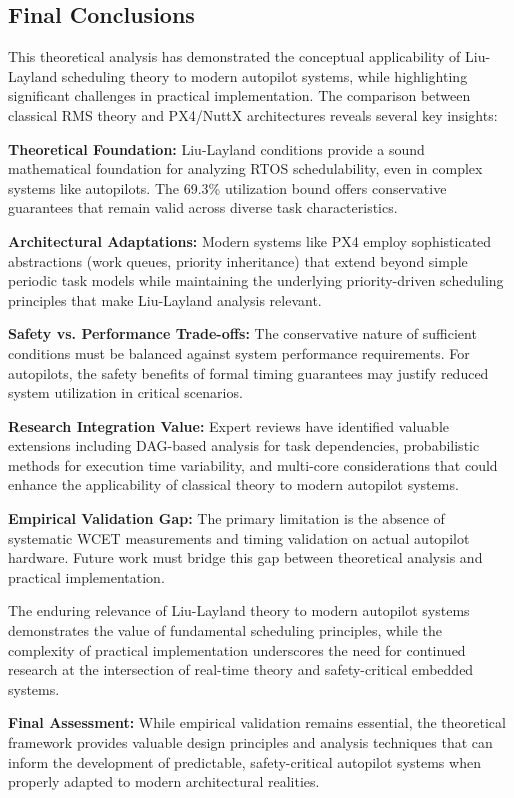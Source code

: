 \documentclass[12pt,a4paper]{article}
\begin{document}
\subsection{Final Conclusions}

This theoretical analysis has demonstrated the conceptual applicability of Liu-Layland scheduling theory to modern autopilot systems, while highlighting significant challenges in practical implementation. The comparison between classical RMS theory and PX4/NuttX architectures reveals several key insights:

\textbf{Theoretical Foundation:} Liu-Layland conditions provide a sound mathematical foundation for analyzing RTOS schedulability, even in complex systems like autopilots. The 69.3\% utilization bound offers conservative guarantees that remain valid across diverse task characteristics.

\textbf{Architectural Adaptations:} Modern systems like PX4 employ sophisticated abstractions (work queues, priority inheritance) that extend beyond simple periodic task models while maintaining the underlying priority-driven scheduling principles that make Liu-Layland analysis relevant.

\textbf{Safety vs. Performance Trade-offs:} The conservative nature of sufficient conditions must be balanced against system performance requirements. For autopilots, the safety benefits of formal timing guarantees may justify reduced system utilization in critical scenarios.

\textbf{Research Integration Value:} Expert reviews have identified valuable extensions including DAG-based analysis for task dependencies, probabilistic methods for execution time variability, and multi-core considerations that could enhance the applicability of classical theory to modern autopilot systems.

\textbf{Empirical Validation Gap:} The primary limitation is the absence of systematic WCET measurements and timing validation on actual autopilot hardware. Future work must bridge this gap between theoretical analysis and practical implementation.

The enduring relevance of Liu-Layland theory to modern autopilot systems demonstrates the value of fundamental scheduling principles, while the complexity of practical implementation underscores the need for continued research at the intersection of real-time theory and safety-critical embedded systems.

\textbf{Final Assessment:} While empirical validation remains essential, the theoretical framework provides valuable design principles and analysis techniques that can inform the development of predictable, safety-critical autopilot systems when properly adapted to modern architectural realities.
\end{document}
